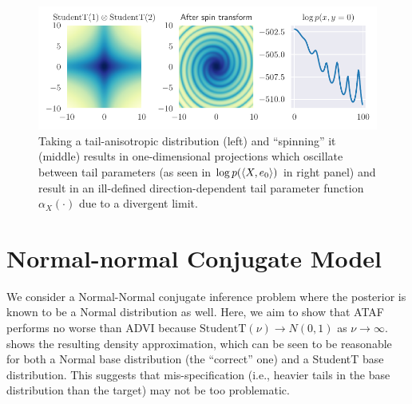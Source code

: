 \documentclass[nohyperref]{article}
\theoremstyle{plain}
\theoremstyle{definition}
\theoremstyle{remark}
\begin{document}
\begin{figure}[htbp]
    \centering
    \vspace{-.5in}
    \includegraphics[scale=0.8]{Figures/spiral.pdf}
    \caption{Taking a tail-anisotropic distribution (left) and ``spinning'' it (middle) results in
        one-dimensional projections which oscillate between tail parameters (as seen in
        $\log p(\braket{X,e_0})$ in right panel) and result in an ill-defined
        direction-dependent tail parameter function $\alpha_X(\cdot)$ due to a
        divergent limit.
    }
    \label{fig:spiral}
\end{figure}


\section{Normal-normal Conjugate Model}
\label{sec:normal-normal-location-mixture}

We consider a Normal-Normal conjugate inference problem where the posterior
is known to be a Normal distribution as well. Here, we aim to show that ATAF
performs no worse than ADVI because $\text{StudentT}(\nu) \to N(0, 1)$ as $\nu \to \infty$.
 shows the resulting density approximation, which can
be seen to be reasonable for both a Normal base distribution (the ``correct'' one)
and a StudentT base distribution. This suggests that mis-specification (i.e., heavier
tails in the base distribution than the target) may not be too problematic.
\end{document}
